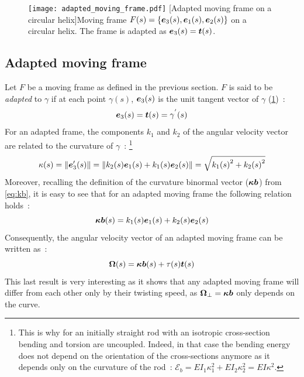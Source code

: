 \begin{figure}[t]
\centering
\texttt{[image: adapted\_moving\_frame.pdf]}
[Adapted moving frame on a circular helix]{Moving frame $F(s) =\{\boldsymbol{e}_{3}(s),\boldsymbol{e}_{1}(s),\boldsymbol{e}_{2}(s)\}$ on a circular helix. The frame is adapted as $\boldsymbol{e}_3(s) = \boldsymbol{t}(s)$.}
\label{fig:adapted}
\end{figure}

\subsection{Adapted moving frame}\label{sec:amf}

Let $F$ be a moving frame as defined in the previous section. $F$ is said to be \emph{adapted} to $\gamma$ if at each point $\gamma(s)$, $\boldsymbol{e}_{3}(s)$ is the unit tangent vector of $\gamma$ (\cref{fig:adapted})~:
\begin{equation}
	\boldsymbol{e}_{3}(s) = \boldsymbol{t}(s) = \gamma^{'}(s)
\end{equation}
For an adapted frame, the components $k_1$ and $k_2$ of the angular velocity vector are related to the curvature of $\gamma$~: \footnote{This is why for an initially straight rod with an isotropic cross-section bending and torsion are uncoupled. Indeed, in that case the bending energy does not depend on the orientation of the cross-sections anymore as it depends only on the curvature of the rod~: $\mathcal{E}_b = EI_1\kappa_1^2 + EI_2\kappa_2^2 = EI\kappa^2$.}
\begin{equation}
	\kappa(s) = \lVert\boldsymbol{e}'_{3}(s)\rVert = \lVert k_2(s)\boldsymbol{e}_1(s) + k_1(s)\boldsymbol{e}_2(s)\rVert = \sqrt{{k_{1}(s)}^2 + {k_{2}(s)}^2}
	\label{eq:kb_components}
\end{equation}
Moreover, recalling the definition of the curvature binormal vector ($\boldsymbol{\kappa b}$) from \cref{eq:kb}, it is easy to see that for an adapted moving frame the following relation holds~:
 \begin{equation}
	\boldsymbol{\kappa b}(s) = k_1(s) \boldsymbol{e}_1(s) +  k_2(s) \boldsymbol{e}_2(s) \label{eq:amf_kb}
\end{equation}
Consequently, the angular velocity vector of an adapted moving frame can be written as~:
 \begin{equation}
	\boldsymbol{\Omega}(s) = \boldsymbol{\kappa b}(s)  + \tau(s) \boldsymbol{t}(s)
	\label{eq:angular_velocity}
\end{equation}
This last result is very interesting as it shows that any adapted moving frame will differ from each other only by their twisting speed, as $\boldsymbol{\Omega}_{\perp} =  \boldsymbol{\kappa b}$ only depends on the curve.

